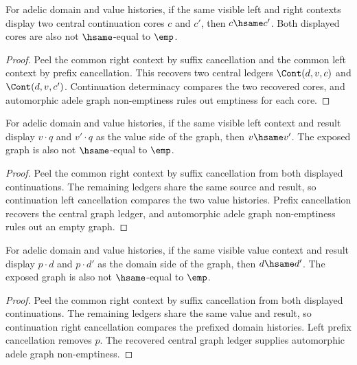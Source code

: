 \begin{theorem}
\label{thm:automorphic-adele-graph-visible-context-core-deterministic-nonempty}
For adelic domain and value histories, if the same visible left and right
contexts display two central continuation cores $c$ and $c'$, then
$c\hsame c'$. Both displayed cores are also not $\hsame$-equal to $\emp$.
\end{theorem}
\begin{proof}
Peel the common right context by suffix cancellation and the common left
context by prefix cancellation. This recovers two central ledgers
$\Cont(d,v,c)$ and $\Cont(d,v,c')$. Continuation determinacy compares the
two recovered cores, and automorphic adele graph non-emptiness rules out
emptiness for each core.
\end{proof}

\begin{theorem}
\label{thm:automorphic-adele-graph-visible-context-value-deterministic}
For adelic domain and value histories, if the same visible left context and
result display \(v \cdot q\) and \(v' \cdot q\) as the value side of the graph,
then \(v\hsame v'\). The exposed graph is also not \(\hsame\)-equal to
\(\emp\).
\end{theorem}
\begin{proof}
Peel the common right context by suffix cancellation from both displayed
continuations. The remaining ledgers share the same source and result, so
continuation left cancellation compares the two value histories. Prefix
cancellation recovers the central graph ledger, and automorphic adele graph
non-emptiness rules out an empty graph.
\end{proof}

\begin{theorem}
\label{thm:automorphic-adele-graph-visible-context-domain-deterministic}
For adelic domain and value histories, if the same visible value context and
result display \(p \cdot d\) and \(p \cdot d'\) as the domain side of the graph,
then \(d\hsame d'\). The exposed graph is also not \(\hsame\)-equal to
\(\emp\).
\end{theorem}
\begin{proof}
Peel the common right context by suffix cancellation from both displayed
continuations. The remaining ledgers share the same value and result, so
continuation right cancellation compares the prefixed domain histories. Left
prefix cancellation removes \(p\). The recovered central graph ledger supplies
automorphic adele graph non-emptiness.
\end{proof}

